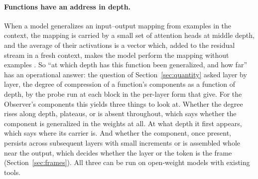 \paragraph{Functions have an address in depth.}
\label{sec:address}
When a model generalizes an input--output mapping from examples in the context, the mapping is carried
by a small set of attention heads at middle depth, and the average of their activations is a vector
which, added to the residual stream in a fresh context, makes the model perform the mapping without
examples \citep{todd2024}. So ``at which depth has this function been generalized, and how far'' has an
operational answer: the question of Section~\ref{sec:quantity} asked layer by layer, the degree of
compression of a function's components as a function of depth, by the probe run at each block in the
per-layer form that \citet{voita2020} give. For the Observer's components this yields three things to
look at. Whether the degree rises along depth, plateaus, or is absent throughout, which says whether
the component is generalized in the weights at all. At what depth it first appears, which says where
its carrier is. And whether the component, once present, persists across subsequent layers with small
increments or is assembled whole near the output, which decides whether the layer or the token is the
frame (Section~\ref{sec:frames}). All three can be run on open-weight models with existing tools.

